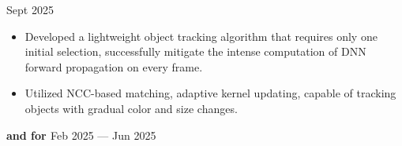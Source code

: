 \documentclass[a4paper,11pt]{article}
\newcommand{\MYhref}[3][black]{\href{#2}{\color{#1}{#3}}}%
\begin{document}





\textbf{\MYhref{https://github.com/Marcobisky/YOPO}{YOPO: You Only Pick Once -- Light Object Tracking Algorithm}} \hfill Sept 2025

\begin{itemize}
    \setlength\itemsep{-0.5em}
    \item Developed a lightweight object tracking algorithm that requires only one initial selection, successfully mitigate the intense computation of DNN forward propagation on every frame.
    \item Utilized NCC-based matching, adaptive kernel updating, capable of tracking objects with gradual color and size changes.
\end{itemize}


\textbf{\MYhref{https://marcobisky.github.io/posts/quadrocopter-control/}{Control} and \MYhref{https://marcobisky.github.io/cv/drone-cv.pdf}{Computer Vision} for \MYhref{https://marcobisky.github.io/cv/drone.pdf}{Autonomous Quadcopter System}} \hfill Feb 2025 --- Jun 2025
\end{document}

